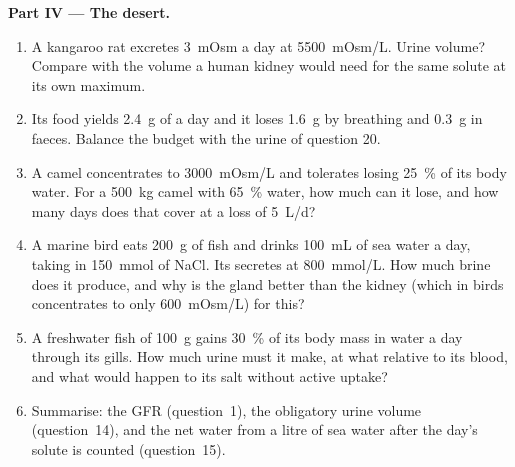 \begin{problem}
\medskip
\noindent\textbf{Part IV --- The desert.}
\begin{enumerate}[resume]
  \item A kangaroo rat excretes \qty{3}{mOsm} a day at \qty{5500}{mOsm/L}.
        Urine volume? Compare with the volume a human kidney would
        need for the same solute at its own maximum.
  \item Its food yields \qty{2.4}{g} of  a day and it
        loses \qty{1.6}{g} by breathing and \qty{0.3}{g} in faeces.
        Balance the budget with the urine of question 20.
  \item A camel concentrates to \qty{3000}{mOsm/L} and tolerates losing
        \qty{25}{\%} of its body water. For a \qty{500}{kg} camel with
        \qty{65}{\%} water, how much can it lose, and how many days does
        that cover at a loss of \qty{5}{L/d}?
  \item A marine bird eats \qty{200}{g} of fish and drinks \qty{100}{mL}
        of sea water a day, taking in \qty{150}{mmol} of NaCl. Its  secretes at \qty{800}{mmol/L}. How much brine does it
        produce, and why is the gland better than the kidney (which in
        birds concentrates to only \qty{600}{mOsm/L}) for this?
  \item A freshwater fish of \qty{100}{g} gains \qty{30}{\%} of its body
        mass in water a day through its gills. How much urine must it
        make, at what  relative to its blood, and what would
        happen to its salt without active uptake?
  \item Summarise: the GFR (question~1), the obligatory urine volume
        (question~14), and the net water from a litre of sea water after
        the day's solute is counted (question~15).
\end{enumerate}
\end{problem}
